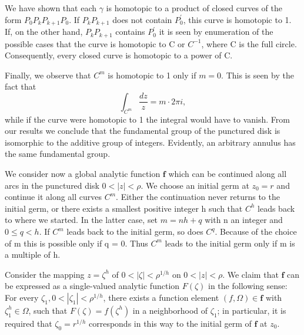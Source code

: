 We have shown that each $\gamma$ is homotopic to a product of closed curves of the form $P_{0}P_{k}P_{k+1}P_{0}$. If $P_{k}P_{k+1}$ does not contain $P_{0}^{\prime}$, this curve is homotopic to 1. If, on the other hand, $P_{k}P_{k+1}$ contains $P_{0}^{\prime}$ it is seen by enumeration of the possible cases that the curve is homotopic to C or $C^{-1}$, where C is the full circle. Consequently, every closed curve is homotopic to a power of C.


Finally, we observe that $C^m$ is homotopic to 1 only if $m = 0$. This is seen by the fact that
\begin{equation*}
\int_ {C ^ {m}} \frac {d z}{z} = m \cdot 2 \pi i,
\end{equation*}
while if the curve were homotopic to 1 the integral would have to vanish. From our results we conclude that the fundamental group of the punctured disk is isomorphic to the additive group of integers. Evidently, an arbitrary annulus has the same fundamental group.

We consider now a global analytic function $\mathbf{f}$ which can be continued along all arcs in the punctured disk $0 < |z| < \rho$. We choose an initial germ at $z_{0} = r$ and continue it along all curves $C^{m}$. Either the continuation never returns to the initial germ, or there exists a smallest positive integer h such that $C^{h}$ leads back to where we started. In the latter case, set $m = nh + q$ with n an integer and $0 \leq q < h$. If $C^{m}$ leads back to the initial germ, so does $C^{q}$. Because of the choice of m this is possible only if q = 0. Thus $C^{m}$ leads to the initial germ only if m is a multiple of h.

Consider the mapping $z = \zeta^h$ of $0 < |\zeta| < \rho^{1/h}$ on $0 < |z| < \rho$. We claim that $\mathbf{f}$ can be expressed as a single-valued analytic function $F(\zeta)$ in the following sense: For every $\zeta_1, 0 < |\zeta_1| < \rho^{1/h}$, there exists a function element $(f,\Omega) \in \mathbf{f}$ with $\zeta_1^h \in \Omega$, such that $F(\zeta) = f(\zeta^h)$ in a neighborhood of $\zeta_1$; in particular, it is required that $\zeta_0 = r^{1/h}$ corresponds in this way to the initial germ of $\mathbf{f}$ at $z_0$.

